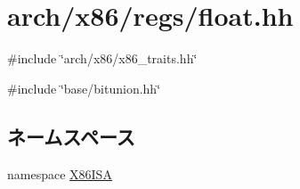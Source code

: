 \hypertarget{float_8hh}{
\section{arch/x86/regs/float.hh}
\label{float_8hh}
}
{\ttfamily \#include \char`\"{}arch/x86/x86\_\-traits.hh\char`\"{}}\par
{\ttfamily \#include \char`\"{}base/bitunion.hh\char`\"{}}\par
\subsection*{ネームスペース}
\begin{DoxyCompactItemize}
\item 
namespace \hyperlink{namespaceX86ISA}{X86ISA}
\end{DoxyCompactItemize}
